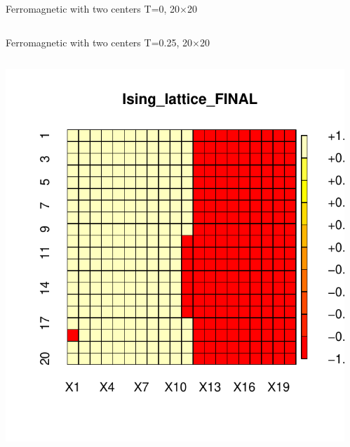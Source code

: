 \documentclass{beamer}
\begin{document}
\begin{frame}{Ferromagnetic with two centers T=0,  20$\times$20}
\begin{columns}
\begin{column}{0.5\textwidth}
\begin{center}
     \end{center}
\end{column}
\end{columns}
\end{frame}

\begin{frame}{Ferromagnetic with two centers T=0.25,  20$\times$20}
\begin{columns}
\begin{column}{0.5\textwidth}
    \begin{center}
     \includegraphics[width=\textwidth]{Pic/J+1_20_10000_T=0.25.pdf}
     \end{center}
\end{column}
\begin{column}{0.5\textwidth}
    \begin{center}

\end{center}
\end{column}
\end{columns}
\end{frame}
\end{document}
